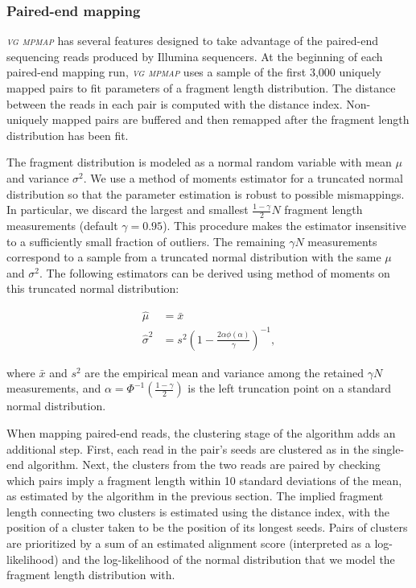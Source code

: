 \documentclass[11pt]{ucthesis}
\newcommand{\tool}[1]{\emph{\textsc{#1}}}
\begin{document}
\subsubsection{Paired-end mapping}

\tool{vg mpmap} has several features designed to take advantage of the paired-end sequencing reads produced by Illumina sequencers. At the beginning of each paired-end mapping run, \tool{vg mpmap} uses a sample of the first 3,000 uniquely mapped pairs to fit parameters of a fragment length distribution. The distance between the reads in each pair is computed with the distance index. Non-uniquely mapped pairs are buffered and then remapped after the fragment length distribution has been fit. 

The fragment distribution is modeled as a normal random variable with mean $\mu$ and variance $\sigma^2$. We use a method of moments estimator for a truncated normal distribution so that the parameter estimation is robust to possible mismappings. In particular, we discard the largest and smallest $\frac{1 - \gamma}{2}N$ fragment length measurements (default ${\gamma = 0.95}$). This procedure makes the estimator insensitive to a sufficiently small fraction of outliers. The remaining $\gamma N$ measurements correspond to a sample from a truncated normal distribution with the same $\mu$ and $\sigma^2$. The following estimators can be derived using method of moments on this truncated normal distribution:

\begin{align}
    \hat \mu &= \bar x \\
	\hat \sigma^2 &= s^2\left(1 - \frac{2\alpha\phi(\alpha)}{\gamma}\right)^{-1},
\end{align}
	
\noindent where $\bar x$ and $s^2$ are the empirical mean and variance among the retained $\gamma N$ measurements, and ${\alpha = \Phi^{-1}\left(\frac{1 - \gamma}{2}\right)}$ is the left truncation point on a standard normal distribution.

When mapping paired-end reads, the clustering stage of the algorithm adds an additional step. First, each read in the pair's seeds are clustered as in the single-end algorithm. Next, the clusters from the two reads are paired by checking which pairs imply a fragment length within 10 standard deviations of the mean, as estimated by the algorithm in the previous section. The implied fragment length connecting two clusters is estimated using the distance index, with the position of a cluster taken to be the position of its longest seeds. Pairs of clusters are prioritized by a sum of an estimated alignment score (interpreted as a log-likelihood) and the log-likelihood of the normal distribution that we model the fragment length distribution with.
\end{document}
